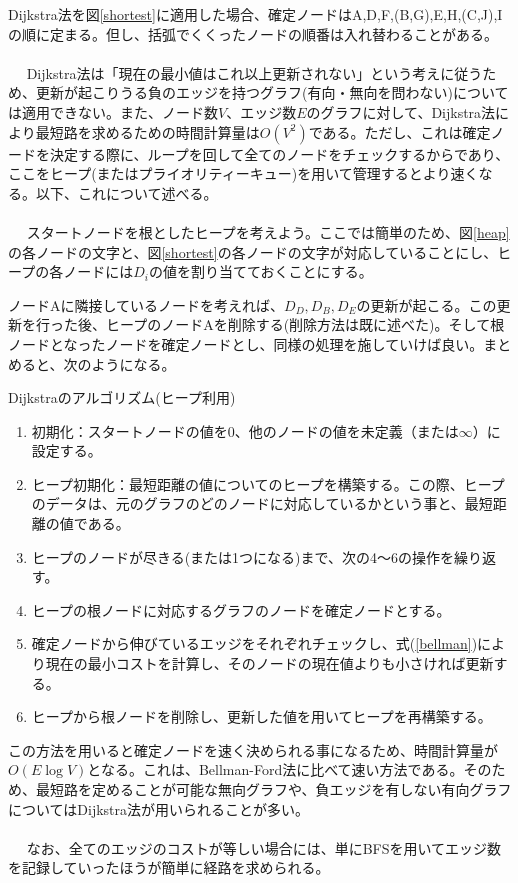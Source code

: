 Dijkstra法を図\ref{shortest}に適用した場合、確定ノードはA,D,F,(B,G),E,H,(C,J),Iの順に定まる。但し、括弧でくくったノードの順番は入れ替わることがある。
\\ \\　
Dijkstra法は「現在の最小値はこれ以上更新されない」という考えに従うため、更新が起こりうる負のエッジを持つグラフ(有向・無向を問わない)については適用できない。また、ノード数$V$、エッジ数$E$のグラフに対して、Dijkstra法により最短路を求めるための時間計算量は$O(V^2)$である。ただし、これは確定ノードを決定する際に、ループを回して全てのノードをチェックするからであり、ここをヒープ(またはプライオリティーキュー)を用いて管理するとより速くなる。以下、これについて述べる。
\\ \\　
スタートノードを根としたヒープを考えよう。ここでは簡単のため、図\ref{heap}の各ノードの文字と、図\ref{shortest}の各ノードの文字が対応していることにし、ヒープの各ノードには$D_i$の値を割り当てておくことにする。

ノードAに隣接しているノードを考えれば、$D_D,D_B,D_E$の更新が起こる。この更新を行った後、ヒープのノードAを削除する(削除方法は既に述べた)。そして根ノードとなったノードを確定ノードとし、同様の処理を施していけば良い。まとめると、次のようになる。
\begin{itembox}[l]{Dijkstraのアルゴリズム(ヒープ利用)}
\begin{enumerate}
\item 初期化：スタートノードの値を0、他のノードの値を未定義（または$\infty$）に設定する。
\item ヒープ初期化：最短距離の値についてのヒープを構築する。この際、ヒープのデータは、元のグラフのどのノードに対応しているかという事と、最短距離の値である。
\item ヒープのノードが尽きる(または1つになる)まで、次の4〜6の操作を繰り返す。
\item ヒープの根ノードに対応するグラフのノードを確定ノードとする。
\item 確定ノードから伸びているエッジをそれぞれチェックし、式(\ref{bellman})により現在の最小コストを計算し、そのノードの現在値よりも小さければ更新する。
\item ヒープから根ノードを削除し、更新した値を用いてヒープを再構築する。
\end{enumerate}
\end{itembox}

この方法を用いると確定ノードを速く決められる事になるため、時間計算量が$O(E\log V)$となる。これは、Bellman-Ford法に比べて速い方法である。そのため、最短路を定めることが可能な無向グラフや、負エッジを有しない有向グラフについてはDijkstra法が用いられることが多い。
\\ \\　
なお、全てのエッジのコストが等しい場合には、単にBFSを用いてエッジ数を記録していったほうが簡単に経路を求められる。

